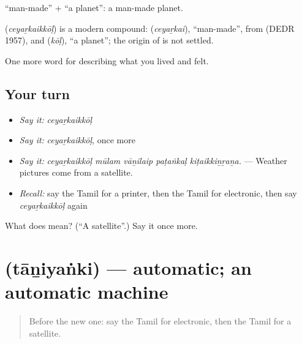  \textquotedblleft{}man-made\textquotedblright{} +  \textquotedblleft{}a planet\textquotedblright{}: a man-made planet.

\begin{cousinweb}
\textbf{} (\emph{ceyaṟkaikkōḷ}) is a modern compound:  (\emph{ceyaṟkai}), \textquotedblleft{}man-made\textquotedblright{}, from  (DEDR 1957), and  (\emph{kōḷ}), \textquotedblleft{}a planet\textquotedblright{}; the origin of  is not settled.
\end{cousinweb}

\begin{grammarlens}[title={What you've built}]
One more word for describing what you lived and felt.
\end{grammarlens}

\subsection*{Your turn}
\begin{itemize}
\raggedright
  \item \emph{Say it:} \emph{ceyaṟkaikkōḷ}
  \item \emph{Say it:} \emph{ceyaṟkaikkōḷ}, once more
  \item \emph{Say it:} \emph{ceyaṟkaikkōḷ mūlam vāṉilaip paṭaṅkaḷ kiṭaikkiṉṟaṉa.} — Weather pictures come from a satellite.
  \item \emph{Recall:} say the Tamil for a printer, then the Tamil for electronic, then say \emph{ceyaṟkaikkōḷ} again
\end{itemize}

\begin{tcolorbox}[breakable,colback=teal!4,colframe=teal!35!black,title={Before you move on}]
What does  mean? (\textquotedblleft{}A satellite\textquotedblright{}.) Say it once more.
\end{tcolorbox}
\section[\texorpdfstring{\ta{தானியங்கி} (tāṉiyaṅki)}{தானியங்கி (tāṉiyaṅki)}]{ (tāṉiyaṅki) — automatic; an automatic machine}

\label{lesson:TA-C520-taniyanki}



\begin{quote}
Before the new one: say the Tamil for electronic, then the Tamil for a satellite.
\end{quote}

